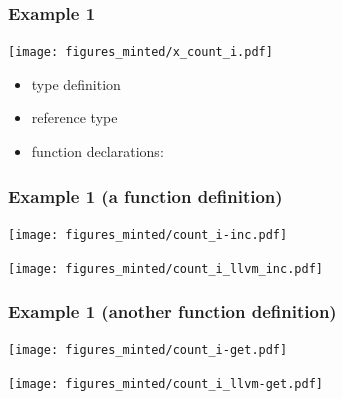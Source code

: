 \documentclass[12pt]{beamer}
\begin{document}
\begin{frame}

  \frametitle{Example 1}

  \begin{center}
    \texttt{[image: figures\_minted/x\_count\_i.pdf]}
  \end{center}

  \begin{itemize}
    \item type definition

{\small \textcolor{blue}{}}
    \item reference type

{\small \textcolor{blue}{}}
    \item function declarations:

{\small
      \textcolor{blue}{}

      \textcolor{blue}{}

      \textcolor{blue}{}
}
    \end{itemize}
\end{frame}

\begin{frame}

  \frametitle{Example 1 (a function definition)}

  \texttt{[image: figures\_minted/count\_i-inc.pdf]}
  
  \vspace*{-10mm}
  \texttt{[image: figures\_minted/count\_i\_llvm\_inc.pdf]}

\end{frame}

\begin{frame}

  \frametitle{Example 1 (another function definition)}

  \texttt{[image: figures\_minted/count\_i-get.pdf]}
  
  \vspace*{-10mm}
  \texttt{[image: figures\_minted/count\_i\_llvm-get.pdf]}

\end{frame}
\end{document}

